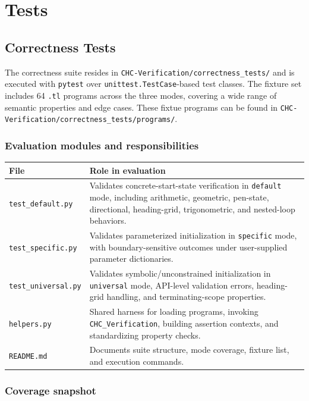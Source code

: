 \section*{Tests}
\label{sec:tests}

\subsection*{Correctness Tests}\label{subsec:correctness_tests}
The correctness suite resides in
\texttt{CHC-Verification/correctness\_tests/} and is executed with
\texttt{pytest} over \texttt{unittest.TestCase}-based test classes. The fixture set includes 64 \texttt{.tl} programs across the three modes, covering a wide range of semantic properties and edge cases. These fixtue programs can be found in \texttt{CHC-Verification/correctness\_tests/programs/}.

\subsubsection*{Evaluation modules and responsibilities}

\begin{longtable}{p{} p{}}
\toprule
\textbf{File} & \textbf{Role in evaluation} \\
\midrule
\texttt{test\_default.py} & Validates concrete-start-state verification in \texttt{default} mode, including arithmetic, geometric, pen-state, directional, heading-grid, trigonometric, and nested-loop behaviors. \\
\texttt{test\_specific.py} & Validates parameterized initialization in \texttt{specific} mode, with boundary-sensitive outcomes under user-supplied parameter dictionaries. \\
\texttt{test\_universal.py} & Validates symbolic/unconstrained initialization in \texttt{universal} mode, API-level validation errors, heading-grid handling, and terminating-scope properties. \\
\texttt{helpers.py} & Shared harness for loading programs, invoking \texttt{CHC\_Verification}, building assertion contexts, and standardizing property checks. \\
\texttt{README.md} & Documents suite structure, mode coverage, fixture list, and execution commands. \\
\bottomrule
\end{longtable}

\subsubsection*{Coverage snapshot}

